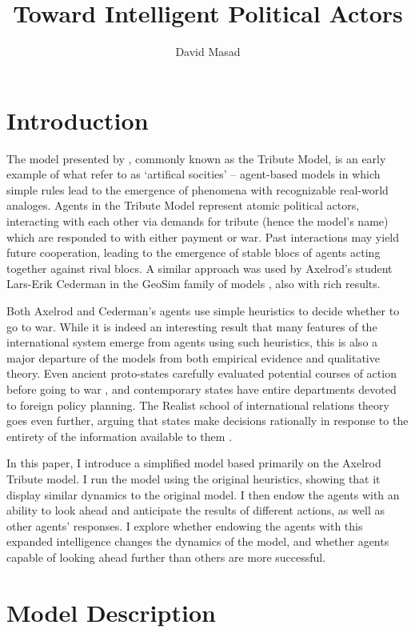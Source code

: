 \documentclass{article}
\begin{document}
\title{Toward Intelligent Political Actors}
	\author{David Masad}
	\maketitle

\section{Introduction}
The model presented by \citet{axelrod_1997}, commonly known as the Tribute Model, is an early example of what \citet{epstein_1996} refer to as `artifical socities' -- agent-based models in which simple rules lead to the emergence of phenomena with recognizable real-world analoges. Agents in the Tribute Model represent atomic political actors, interacting with each other via demands for tribute (hence the model's name) which are responded to with either payment or war. Past interactions may yield future cooperation, leading to the emergence of stable blocs of agents acting together against rival blocs. A similar approach was used by Axelrod's student Lars-Erik Cederman in the GeoSim family of models \citep{cederman_2003}, also with rich results.

Both Axelrod and Cederman's agents use simple heuristics to decide whether to go to war. While it is indeed an interesting result that many features of the international system emerge from agents using such heuristics, this is also a major departure of the models from both empirical evidence and qualitative theory. Even ancient proto-states carefully evaluated potential courses of action before going to war \citep{sheldon_1989}, and contemporary states have entire departments devoted to foreign policy planning. The Realist school of international relations theory goes even further, arguing that states make decisions rationally in response to the entirety of the information available to them \citep{waltz_2010}. 

In this paper, I introduce a simplified model based primarily on the Axelrod Tribute model. I run the model using the original heuristics, showing that it display similar dynamics to the original model. I then endow the agents with an ability to look ahead and anticipate the results of different actions, as well as other agents' responses. I explore whether endowing the agents with this expanded intelligence changes the dynamics of the model, and whether agents capable of looking ahead further than others are more successful. 

\section{Model Description}
\end{document}
